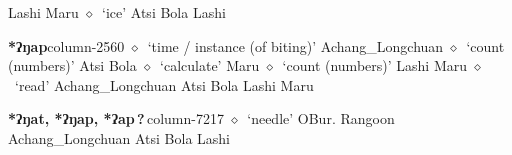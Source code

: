          Lashi 
\hspace{1ex}
         Maru 
\hspace{1ex}
         $\diamond$~`ice'
         Atsi 
\hspace{1ex}
         Bola 
\hspace{1ex}
         Lashi 
  \item {\footnotesize \textbf{*ʔŋap}}{\tiny column-2560}
         $\diamond$~`time / instance (of biting)'
         Achang\_Longchuan 
\hspace{1ex}
         $\diamond$~`count (numbers)'
         Atsi 
\hspace{1ex}
         Bola 
\hspace{1ex}
         $\diamond$~`calculate'
         Maru 
\hspace{1ex}
         $\diamond$~`count (numbers)'
         Lashi 
\hspace{1ex}
         Maru 
\hspace{1ex}
         $\diamond$~`read'
         Achang\_Longchuan 
\hspace{1ex}
         Atsi 
\hspace{1ex}
         Bola 
\hspace{1ex}
         Lashi 
\hspace{1ex}
         Maru 
  \item {\footnotesize \textbf{*ʔŋat, *ʔŋap, *ʔap\,?\,}}{\tiny column-7217}
         $\diamond$~`needle'
         OBur. 
\hspace{1ex}
         Rangoon 
\hspace{1ex}
         Achang\_Longchuan 
\hspace{1ex}
         Atsi 
\hspace{1ex}
         Bola 
\hspace{1ex}
         Lashi 
\hspace{1ex}
